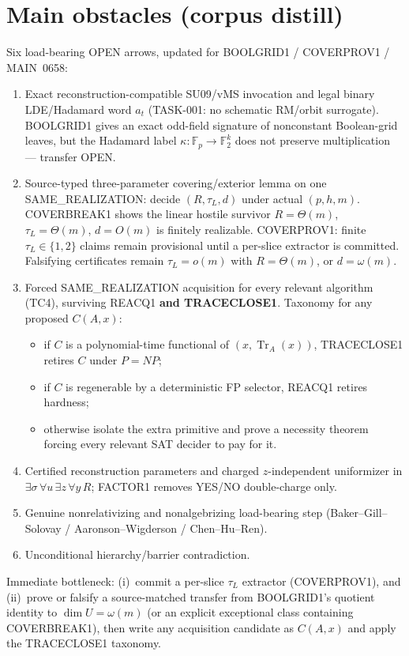 \documentclass[11pt]{article}
\begin{document}
\section*{Main obstacles (corpus distill)}
Six load-bearing OPEN arrows, updated for BOOLGRID1 / COVERPROV1 / MAIN~0658:
\begin{enumerate}
\item Exact reconstruction-compatible SU09/vMS invocation and legal binary LDE/Hadamard
word $a_t$ (TASK-001: no schematic RM/orbit surrogate). BOOLGRID1 gives an exact
odd-field signature of nonconstant Boolean-grid leaves, but the Hadamard label
$\kappa:\mathbb F_p\to\mathbb F_2^k$ does not preserve multiplication --- transfer OPEN.
\item Source-typed three-parameter covering/exterior lemma on one SAME\_REALIZATION:
decide $(R,\tau_L,d)$ under actual $(p,h,m)$. COVERBREAK1 shows the linear hostile
survivor $R=\Theta(m)$, $\tau_L=\Theta(m)$, $d=O(m)$ is finitely realizable.
COVERPROV1: finite $\tau_L\in\{1,2\}$ claims remain provisional until a per-slice
extractor is committed. Falsifying certificates remain $\tau_L=o(m)$ with $R=\Theta(m)$,
or $d=\omega(m)$.
\item Forced SAME\_REALIZATION acquisition for every relevant algorithm (TC4), surviving
REACQ1 \textbf{and TRACECLOSE1}. Taxonomy for any proposed $C(A,x)$:
\begin{itemize}
\item if $C$ is a polynomial-time functional of $(x,\operatorname{Tr}_A(x))$, TRACECLOSE1
retires $C$ under $P=NP$;
\item if $C$ is regenerable by a deterministic FP selector, REACQ1 retires hardness;
\item otherwise isolate the extra primitive and prove a necessity theorem forcing every
relevant SAT decider to pay for it.
\end{itemize}
\item Certified reconstruction parameters and charged $z$-independent uniformizer in
$\exists\sigma\,\forall u\,\exists z\,\forall y\,R$; FACTOR1 removes YES/NO double-charge only.
\item Genuine nonrelativizing and nonalgebrizing load-bearing step
(Baker--Gill--Solovay / Aaronson--Wigderson / Chen--Hu--Ren).
\item Unconditional hierarchy/barrier contradiction.
\end{enumerate}
Immediate bottleneck: (i)~commit a per-slice $\tau_L$ extractor (COVERPROV1), and
(ii)~prove or falsify a source-matched transfer from BOOLGRID1's quotient identity to
$\dim U=\omega(m)$ (or an explicit exceptional class containing COVERBREAK1), then write
any acquisition candidate as $C(A,x)$ and apply the TRACECLOSE1 taxonomy.
\end{document}
